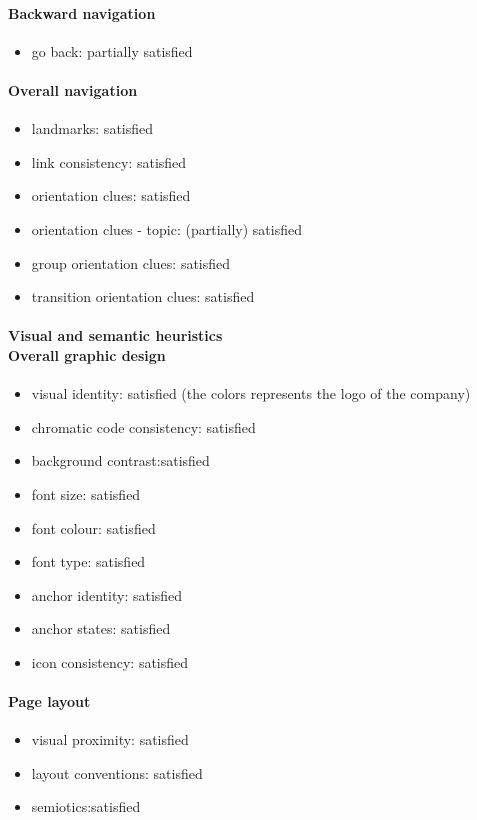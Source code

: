 \begin{enumerate}
	\paragraph*{Backward navigation}
	\begin{itemize}
		\item go back: partially satisfied
	\end{itemize}
	
	\paragraph*{Overall navigation}
	\begin{itemize}
		\item landmarks: satisfied
		\item link consistency: satisfied
		\item orientation clues: satisfied
		\item orientation clues - topic: (partially) satisfied
		\item group orientation clues: satisfied
		\item transition orientation clues: satisfied
	\end{itemize}	
	
	\paragraph*{Visual and semantic heuristics \\ Overall graphic design }
	\begin{itemize}
		\item visual identity: satisfied (the colors represents the logo of the company)
		\item chromatic code consistency: satisfied
		\item background contrast:satisfied
		\item font size: satisfied
		\item font colour: satisfied
		\item font type: satisfied
		\item anchor identity: satisfied
		\item anchor states: satisfied
		\item icon consistency: satisfied
	\end{itemize}
	
	\paragraph*{Page layout}
	\begin{itemize}
		\item visual proximity: satisfied
		\item layout conventions: satisfied
		\item semiotics:satisfied
	\end{itemize}	
	

\end{enumerate}
